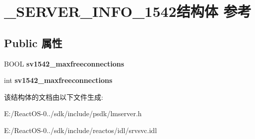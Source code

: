 \hypertarget{struct___s_e_r_v_e_r___i_n_f_o__1542}{}\section{\+\_\+\+S\+E\+R\+V\+E\+R\+\_\+\+I\+N\+F\+O\+\_\+1542结构体 参考}
\label{struct___s_e_r_v_e_r___i_n_f_o__1542}
\subsection*{Public 属性}
\begin{DoxyCompactItemize}
\item 
\mbox{\label{struct___s_e_r_v_e_r___i_n_f_o__1542_a6b9c220c852e2e7cd347ab987e2e3b4f}} 
B\+O\+OL {\bfseries sv1542\+\_\+maxfreeconnections}
\item 
\mbox{\label{struct___s_e_r_v_e_r___i_n_f_o__1542_ad46d0a60edb831c641011cc2c665b0f5}} 
int {\bfseries sv1542\+\_\+maxfreeconnections}
\end{DoxyCompactItemize}


该结构体的文档由以下文件生成\+:\begin{DoxyCompactItemize}
\item 
E\+:/\+React\+O\+S-\/0../sdk/include/psdk/lmserver.\+h\item 
E\+:/\+React\+O\+S-\/0../sdk/include/reactos/idl/srvsvc.\+idl\end{DoxyCompactItemize}

